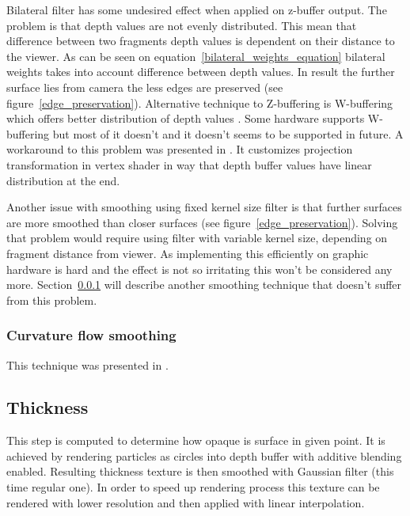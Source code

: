Bilateral filter has some undesired effect when applied on z-buffer output. The problem is that depth values are not evenly distributed. This mean that difference between two fragments depth values is dependent on their distance to the viewer. As can be seen on equation~\ref{bilateral_weights_equation} bilateral weights takes into account difference between depth values. In result the further surface lies from camera the less edges are preserved (see figure~\ref{edge_preservation}). Alternative technique to Z-buffering is W-buffering which offers better distribution of depth values \cite{Gregory2009}. Some hardware supports W-buffering but most of it doesn't and it doesn't seems to be supported in future. A workaround to this problem was presented in \cite{Dunlop2006}. It customizes projection transformation in vertex shader in way that depth buffer values have linear distribution at the end. 

Another issue with smoothing using fixed kernel size filter is that further surfaces are more smoothed than closer surfaces (see figure~\ref{edge_preservation}). Solving that problem would require using filter with variable kernel size, depending on fragment distance from viewer. As implementing this efficiently on graphic hardware is hard and the effect is not so irritating this won't be considered any more. Section~\ref{sec:curvatureflowsmoothing} will describe another smoothing technique that doesn't suffer from this problem. 

\subsubsection{Curvature flow smoothing} \label{sec:curvatureflowsmoothing}
This technique was presented in \cite{laanSainz2009}. 

\subsection{Thickness} \label{sec:thickness}
This step is computed to determine how opaque is surface in given point. It is achieved by rendering particles as circles into depth buffer with additive blending enabled. Resulting thickness texture is then smoothed with Gaussian filter (this time regular one). In order to speed up rendering process this texture can be rendered with lower resolution and then applied with linear interpolation. 

